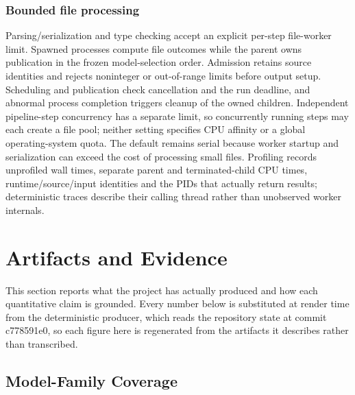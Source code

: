 \documentclass[
  english,
  9pt,
]{extarticle}
\begin{document}
\subsubsection{Bounded file processing}\label{bounded-file-processing}

Parsing/serialization and type checking accept an explicit per-step
file-worker limit. Spawned processes compute file outcomes while the
parent owns publication in the frozen model-selection order. Admission
retains source identities and rejects noninteger or out-of-range limits
before output setup. Scheduling and publication check cancellation and
the run deadline, and abnormal process completion triggers cleanup of
the owned children. Independent pipeline-step concurrency has a separate
limit, so concurrently running steps may each create a file pool;
neither setting specifies CPU affinity or a global operating-system
quota. The default remains serial because worker startup and
serialization can exceed the cost of processing small files. Profiling
records unprofiled wall times, separate parent and terminated-child CPU
times, runtime/source/input identities and the PIDs that actually return
results; deterministic traces describe their calling thread rather than
unobserved worker internals.

\newpage

\section{Artifacts and Evidence}\label{sec:artifacts_evidence}

This section reports what the project has actually produced and how each
quantitative claim is grounded. Every number below is substituted at
render time from the deterministic producer, which reads the repository
state at commit c778591e0, so each figure here is regenerated from the
artifacts it describes rather than transcribed.

\subsection{Model-Family Coverage}\label{model-family-coverage}
\end{document}
